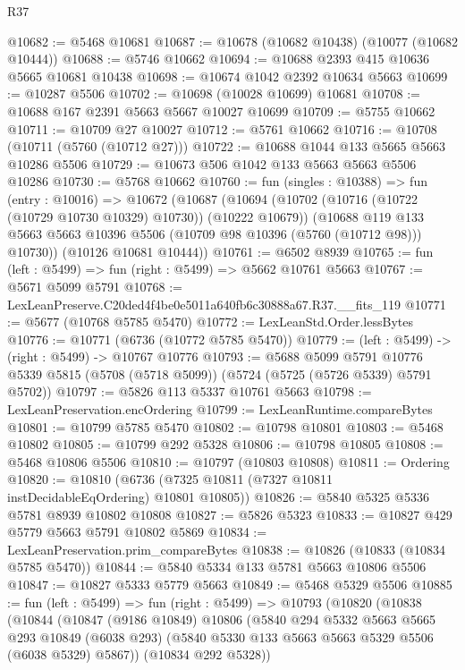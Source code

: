 \begin{lexlean}{R37}
\begin{coremodule}
@10682 := @5468 @10681
@10687 := @10678 (@10682 @10438) (@10077 (@10682 @10444))
@10688 := @5746 @10662
@10694 := @10688 @2393 @415 @10636 @5665 @10681 @10438
@10698 := @10674 @1042 @2392 @10634 @5663
@10699 := @10287 @5506
@10702 := @10698 (@10028 @10699) @10681
@10708 := @10688 @167 @2391 @5663 @5667 @10027 @10699
@10709 := @5755 @10662
@10711 := @10709 @27 @10027
@10712 := @5761 @10662
@10716 := @10708 (@10711 (@5760 (@10712 @27)))
@10722 := @10688 @1044 @133 @5665 @5663 @10286 @5506
@10729 := @10673 @506 @1042 @133 @5663 @5663 @5506 @10286
@10730 := @5768 @10662
@10760 := fun (singles : @10388) =>
  fun (entry : @10016) =>
  @10672
    (@10687
      (@10694
        (@10702 (@10716 (@10722 (@10729 @10730 @10329) @10730)) (@10222 @10679))
        (@10688 @119 @133 @5663 @5663 @10396 @5506 (@10709 @98 @10396 (@5760 (@10712 @98))) @10730))
      (@10126 @10681 @10444))
@10761 := @6502 @8939
@10765 := fun (left : @5499) => fun (right : @5499) => @5662 @10761 @5663
@10767 := @5671 @5099 @5791
@10768 := LexLeanPreserve.C20ded4f4be0e5011a640fb6c30888a67.R37.__fits_119
@10771 := @5677 (@10768 @5785 @5470)
@10772 := LexLeanStd.Order.lessBytes
@10776 := @10771 (@6736 (@10772 @5785 @5470))
@10779 := (left : @5499) -> (right : @5499) -> @10767 @10776
@10793 := @5688
    @5099
    @5791
    @10776
    @5339
    @5815
    (@5708 (@5718 @5099))
    (@5724 (@5725 (@5726 @5339) @5791 @5702))
@10797 := @5826 @113 @5337 @10761 @5663
@10798 := LexLeanPreservation.encOrdering
@10799 := LexLeanRuntime.compareBytes
@10801 := @10799 @5785 @5470
@10802 := @10798 @10801
@10803 := @5468 @10802
@10805 := @10799 @292 @5328
@10806 := @10798 @10805
@10808 := @5468 @10806 @5506
@10810 := @10797 (@10803 @10808)
@10811 := Ordering
@10820 := @10810 (@6736 (@7325 @10811 (@7327 @10811 instDecidableEqOrdering) @10801 @10805))
@10826 := @5840 @5325 @5336 @5781 @8939 @10802 @10808
@10827 := @5826 @5323
@10833 := @10827 @429 @5779 @5663 @5791 @10802 @5869
@10834 := LexLeanPreservation.prim_compareBytes
@10838 := @10826 (@10833 (@10834 @5785 @5470))
@10844 := @5840 @5334 @133 @5781 @5663 @10806 @5506
@10847 := @10827 @5333 @5779 @5663
@10849 := @5468 @5329 @5506
@10885 := fun (left : @5499) =>
  fun (right : @5499) =>
  @10793
    (@10820
      (@10838
        (@10844
          (@10847
            (@9186 @10849)
            @10806
            (@5840
              @294
              @5332
              @5663
              @5665
              @293
              @10849
              (@6038 @293)
              (@5840 @5330 @133 @5663 @5663 @5329 @5506 (@6038 @5329) @5867))
            (@10834 @292 @5328))

\end{coremodule}
\end{lexlean}
